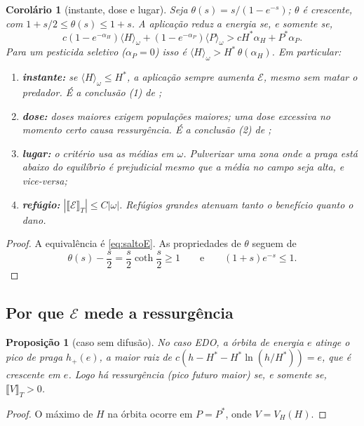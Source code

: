 \documentclass[11pt,a4paper]{article}
\numberwithin{equation}{section}
\newtheorem{proposicao}[teorema]{Proposição}
\newtheorem{corolario}[teorema]{Corolário}
\theoremstyle{definition}
\theoremstyle{remark}
\newcommand{\E}{\mathcal{E}}
\newcommand{\jump}[1]{\llbracket #1 \rrbracket}
\newcommand{\Hs}{H^{*}}
\newcommand{\Ps}{P^{*}}
\newcommand{\med}[1]{\langle #1\rangle_\omega}
\begin{document}
\begin{corolario}[instante, dose e lugar]\label{cor:limiar}
Seja $\theta(s)=s/(1-e^{-s})$; $\theta$ é crescente, com $1+s/2\le\theta(s)\le1+s$. A aplicação
reduz a energia se, e somente se,
\begin{equation}\label{eq:criterio}
c(1-e^{-\alpha_H})\med H+(1-e^{-\alpha_P})\med P>c\Hs\alpha_H+\Ps\alpha_P .
\end{equation}
Para um pesticida seletivo ($\alpha_P=0$) isso é $\med H>\Hs\,\theta(\alpha_H)$. Em particular:
\begin{enumerate}
\item[(i)] \textbf{instante:} se $\med H\le\Hs$, a aplicação sempre aumenta $\E$, mesmo sem matar o
predador. É a conclusão (1) de \cite{LiYang};
\item[(ii)] \textbf{dose:} doses maiores exigem populações maiores; uma dose excessiva no momento certo
causa ressurgência. É a conclusão (2) de \cite{LiYang};
\item[(iii)] \textbf{lugar:} o critério usa as médias em $\omega$. Pulverizar uma zona onde a praga está
abaixo do equilíbrio é prejudicial mesmo que a média no campo seja alta, e vice-versa;
\item[(iv)] \textbf{refúgio:} $|\jump{\E}_T|\le C|\omega|$. Refúgios grandes atenuam tanto o benefício
quanto o dano.
\end{enumerate}
\end{corolario}

\begin{proof}
A equivalência é \eqref{eq:saltoE}. As propriedades de $\theta$ seguem de
\[\theta(s)-\frac s2=\frac s2\coth\frac s2\ge1\qquad\text{e}\qquad(1+s)e^{-s}\le1.\]
\end{proof}

\subsection{Por que $\E$ mede a ressurgência}

\begin{proposicao}[caso sem difusão]\label{prop:edo}
No caso EDO, a órbita de energia $e$ atinge o pico de praga $h_+(e)$, a maior raiz de
$c(h-\Hs-\Hs\ln(h/\Hs))=e$, que é crescente em $e$. Logo há ressurgência (pico futuro maior) se, e
somente se, $\jump V_T>0$.
\end{proposicao}

\begin{proof}
O máximo de $H$ na órbita ocorre em $P=\Ps$, onde $V=V_H(H)$.
\end{proof}
\end{document}
